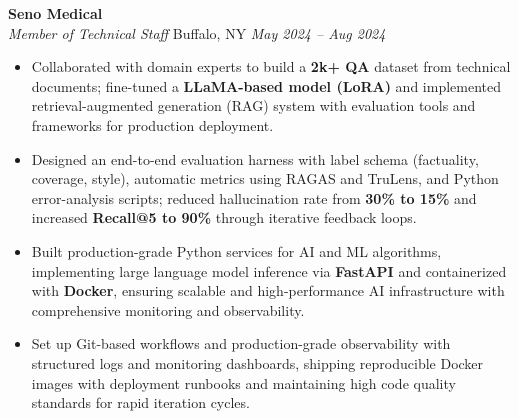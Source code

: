 \vspace*{-1pt}
\item \textbf{Seno Medical}\\
\textit{Member of Technical Staff} \hfill Buffalo, NY \quad \textit{May 2024 -- Aug 2024}
\vspace*{-3pt}
\begin{itemize}[leftmargin=0.2in, topsep=1pt]
  \item Collaborated with domain experts to build a \textbf{2k+ QA} dataset from technical documents; fine-tuned a \textbf{LLaMA-based model (LoRA)} and implemented retrieval-augmented generation (RAG) system with evaluation tools and frameworks for production deployment.
  \item Designed an end-to-end evaluation harness with label schema (factuality, coverage, style), automatic metrics using RAGAS and TruLens, and Python error-analysis scripts; reduced hallucination rate from \textbf{30\% to 15\%} and increased \textbf{Recall@5 to 90\%} through iterative feedback loops.
  \item Built production-grade Python services for AI and ML algorithms, implementing large language model inference via \textbf{FastAPI} and containerized with \textbf{Docker}, ensuring scalable and high-performance AI infrastructure with comprehensive monitoring and observability.
  \item Set up Git-based workflows and production-grade observability with structured logs and monitoring dashboards, shipping reproducible Docker images with deployment runbooks and maintaining high code quality standards for rapid iteration cycles.
\end{itemize}

